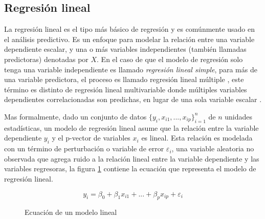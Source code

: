 \subsection{Regresión lineal}

La regresión lineal es el tipo más básico de regresión y es comúnmente usado en el análisis predictivo.
Es un enfoque para modelar la relación entre una variable dependiente escalar, y una o más variables independientes (también llamadas predictoras) denotadas por $X$. 
En el caso de que el modelo de regresión solo tenga una variable independiente es llamado \textit{regresión lineal simple}, para más de una variable predictora, el proceso es llamado regresión lineal múltiple \cite{DAFreedmanStatisticalModels}, este término es distinto de regresión lineal multivariable donde múltiples variables dependientes correlacionadas son predichas, en lugar de una sola variable escalar \cite{ACRencherWFChristensenMethods}.

Mas formalmente, dado un conjunto de datos $\{y_i,x_{i1},...,x_{ip}\}_{i=1}^n$ de $n$ unidades estadísticas, un modelo de regresión lineal asume que la relación entre la variable dependiente $y_i$ y el p-vector de variables $x_i$ es lineal. Esta relación es modelada
con un término de perturbación o variable de error $\varepsilon_i$, una variable aleatoria no observada que agrega ruido a la relación lineal entre la variable dependiente y las variables regresoras, la figura \ref{ec:regresionLineal} contiene la ecuación que representa el modelo de regresión lineal.

\begin{figure}
\[ y_i= \beta_0 + \beta_1x_{i1} +...+ \beta_px_{ip} + \varepsilon_i \]
\caption{Ecuación de un modelo lineal}
\label{ec:regresionLineal}
\end{figure}

